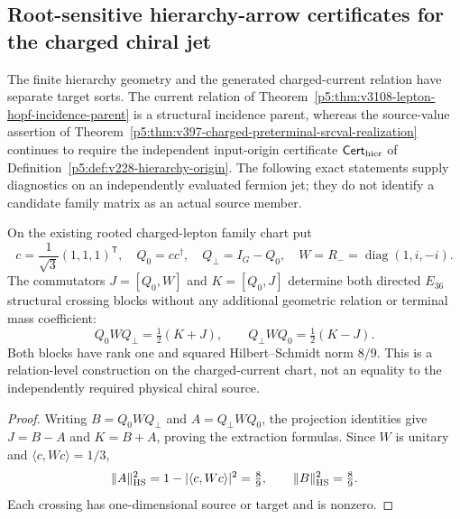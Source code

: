 \documentclass[12pt,a4paper]{article}
\begin{document}
\subsection{Root-sensitive hierarchy-arrow certificates for the charged chiral jet}
\label{p5:sec:v3211-root-sensitive-charged-jet}
The finite hierarchy geometry and the generated charged-current relation have
separate target sorts.  The current relation of
Theorem~\ref{p5:thm:v3108-lepton-hopf-incidence-parent} is a structural
incidence parent, whereas the source-value assertion of
Theorem~\ref{p5:thm:v397-charged-preterminal-srcval-realization} continues to
require the independent input-origin certificate
\(\mathsf{Cert}_{\rm hier}\) of
Definition~\ref{p5:def:v228-hierarchy-origin}.  The following exact
statements supply diagnostics on an independently evaluated fermion jet;
they do not identify a candidate family matrix as an actual source member.

\begin{proposition}
\label{p5:prop:v3211-hopf-crossing-commutator}
On the existing rooted charged-lepton family chart put
\[
 c=\frac1{\sqrt3}(1,1,1)^{\mathsf T},\quad
 Q_0=cc^\dagger,\quad Q_\perp=I_G-Q_0,\quad
 W=R_-=\operatorname{diag}(1,i,-i).
\]
The commutators \(J=[Q_0,W]\) and \(K=[Q_0,J]\) determine both directed
\(E_{36}\) structural crossing blocks without any additional geometric
relation or terminal mass coefficient:
\[
 \boxed{Q_0WQ_\perp=\tfrac12(K+J),\qquad
 Q_\perp WQ_0=\tfrac12(K-J).}
\]
Both blocks have rank one and squared Hilbert--Schmidt norm \(8/9\).
This is a relation-level construction on the charged-current chart,
not an equality to the independently required physical chiral source.
\end{proposition}
\begin{proof}
Writing \(B=Q_0WQ_\perp\) and \(A=Q_\perp WQ_0\), the projection
identities give \(J=B-A\) and \(K=B+A\), proving the extraction formulas.
Since \(W\) is unitary and \(\langle c,Wc\rangle=1/3\),
\[
 \|A\|_{\rm HS}^2=1-|\langle c,Wc\rangle|^2=\tfrac89,
 \qquad \|B\|_{\rm HS}^2=\tfrac89.
\]
Each crossing has one-dimensional source or target and is nonzero.
\end{proof}
\end{document}
